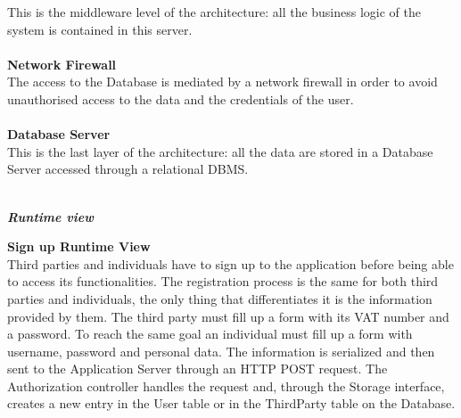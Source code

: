 \begin{legal}
This is the middleware level of the architecture: all the business logic of
the system is contained in this server.\\\\
		\textbf{Network Firewall}\\
The access to the Database is mediated by a network firewall in order to
avoid unauthorised access to the data and the credentials of the user.\\\\
		\textbf{Database Server}\\
This is the last layer of the architecture: all the data are stored in a Database Server accessed through a relational DBMS. \\\\
		\newpage
		\item \textit{\textbf{Runtime view}}\\
			\begin{legal}
				\item \textbf{Sign up Runtime View}\\
Third parties and individuals have to sign up to the application before being able to access its functionalities.
The registration process is the same for both third parties and individuals, the only thing that differentiates it  is the information provided by them.
The third party must fill up a form with its VAT number and a password. To reach the same goal an individual must fill up a form with username, password and personal data.
The information is serialized and then sent to the Application Server through an HTTP POST request.
The Authorization controller handles the request and, through the Storage interface, creates a new
entry in the User table or in the ThirdParty table on the Database. \\
				

\end{legal}
\end{legal}
